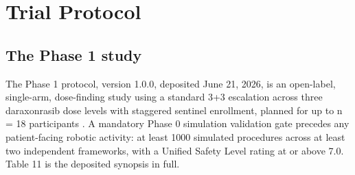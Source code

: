 \section{Trial Protocol}
\label{sec:protocol}

\subsection{The Phase 1 study}

The Phase 1 protocol, version 1.0.0, deposited June 21, 2026, is an open-label,
single-arm, dose-finding study using a standard 3+3 escalation across three
daraxonrasib dose levels with staggered sentinel enrollment, planned for up to
n = 18 participants \cite{onpremwhippl}. A mandatory Phase 0 simulation
validation gate precedes any patient-facing robotic activity: at least 1000
simulated procedures across at least two independent frameworks, with a Unified
Safety Level rating at or above 7.0. Table 11 is the deposited synopsis in
full.


